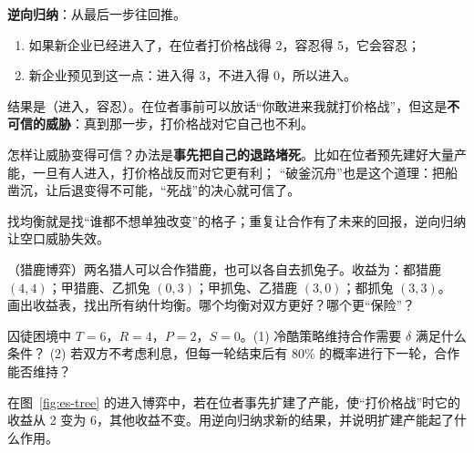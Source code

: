 \textbf{逆向归纳}：从最后一步往回推。
\begin{enumerate}
  \item 如果新企业已经进入了，在位者打价格战得 2，容忍得 5，它会容忍；
  \item 新企业预见到这一点：进入得 3，不进入得 0，所以进入。
\end{enumerate}
结果是（进入，容忍）。在位者事前可以放话“你敢进来我就打价格战”，但这是\textbf{不可信的威胁}：真到那一步，打价格战对它自己也不利。

怎样让威胁变得可信？办法是\textbf{事先把自己的退路堵死}。比如在位者预先建好大量产能，一旦有人进入，打价格战反而对它更有利；
“破釜沉舟”也是这个道理：把船凿沉，让后退变得不可能，“死战”的决心就可信了。

\begin{oneline}
找均衡就是找“谁都不想单独改变”的格子；重复让合作有了未来的回报，逆向归纳让空口威胁失效。
\end{oneline}

\begin{exercises}[练一练]
  \item （猎鹿博弈）两名猎人可以合作猎鹿，也可以各自去抓兔子。收益为：都猎鹿 $(4,4)$；甲猎鹿、乙抓兔 $(0,3)$；甲抓兔、乙猎鹿 $(3,0)$；都抓兔 $(3,3)$。
        画出收益表，找出所有纳什均衡。哪个均衡对双方更好？哪个更“保险”？
  \item 囚徒困境中 $T=6$，$R=4$，$P=2$，$S=0$。(1) 冷酷策略维持合作需要 $\delta$ 满足什么条件？
        (2) 若双方不考虑利息，但每一轮结束后有 80\% 的概率进行下一轮，合作能否维持？
  \item 在图~\ref{fig:es-tree} 的进入博弈中，若在位者事先扩建了产能，使“打价格战”时它的收益从 2 变为 6，其他收益不变。用逆向归纳求新的结果，并说明扩建产能起了什么作用。
\end{exercises}
